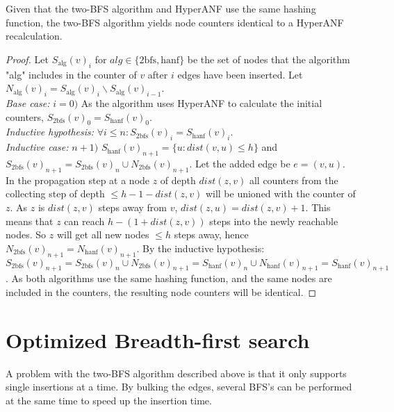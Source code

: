 \begin{theorem} Given that the two-BFS algorithm and HyperANF use the same hashing function, the two-BFS algorithm yields node counters identical to a HyperANF recalculation.

\begin{proof}Let $S_\text{alg}(v)_i$ for $alg \in \{\text{2bfs}, \text{hanf}\}$ be the set of nodes that the algorithm "alg" includes in the counter of $v$ after $i$ edges have been inserted. Let $N_\text{alg}(v)_i = S_\text{alg}(v)_i \backslash S_\text{alg}(v)_{i-1}$.\\

\noindent\textit{Base case:} $i = 0)$ As the algorithm uses HyperANF to calculate the initial counters, $S_\text{2bfs}(v)_0 = S_\text{hanf}(v)_0$.\\

\noindent\textit{Inductive hypothesis: } $\forall i \leq n : S_\text{2bfs}(v)_i = S_\text{hanf}(v)_i$.\\

\noindent\textit{Inductive case: } $n + 1)$  $S_\text{hanf}(v)_{n+1} = \{ u : dist(v,u) \leq h \}$ and $S_\text{2bfs}(v)_{n+1} = S_\text{2bfs}(v)_{n} \cup N_\text{2bfs}(v)_{n+1}$. Let the added edge be $e = (v,u)$. In the propagation step at a node $z$ of depth $dist(z,v)$ all counters from the collecting step of depth $\leq h-1-dist(z,v)$ will be unioned with the counter of $z$. As $z$ is $dist(z,v)$ steps away from $v$, $dist(z,u) = dist(z,v) + 1$. This means that $z$ can reach $h-(1+dist(z,v))$ steps into the newly reachable nodes. So $z$ will get all new nodes $\leq h$ steps away, hence $N_\text{2bfs}(v)_{n+1} = N_\text{hanf}(v)_{n+1}$. By the inductive hypothesis: $S_\text{2bfs}(v)_{n+1} = S_\text{2bfs}(v)_n \cup N_\text{2bfs}(v)_{n+1} = S_\text{hanf}(v)_n \cup N_\text{hanf}(v)_{n+1} = S_\text{hanf}(v)_{n+1}$. As both algorithms use the same hashing function, and the same nodes are included in the counters, the resulting node counters will be identical.

\end{proof}
\end{theorem}

\section{Optimized Breadth-first search}

A problem with the two-BFS algorithm described above is that it only supports single insertions at a time. By bulking the edges, several BFS's can be performed at the same time to speed up the insertion time. 

